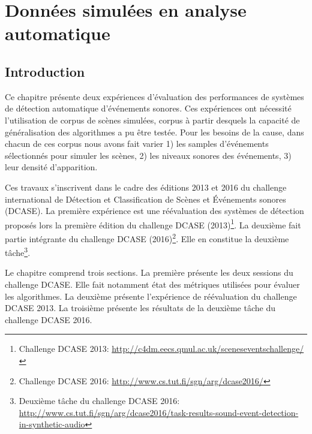 \chapter[Données simulées en analyse automatique]{Données simulées en analyse automatique}\label{ch:ml_simuperf}


\section{Introduction}

Ce chapitre présente deux expériences d'évaluation des performances de systèmes de détection automatique d'événements sonores. Ces expériences ont nécessité l'utilisation de corpus de scènes simulées, corpus à partir desquels la capacité de généralisation des algorithmes a pu être testée. Pour les besoins de la cause, dans chacun de ces corpus nous avons fait varier 1) les samples d'événements sélectionnés pour simuler les scènes, 2) les niveaux sonores des événements, 3) leur densité d'apparition.

Ces travaux s'inscrivent dans le cadre des éditions 2013 et 2016 du challenge international de Détection et Classification de Scènes et Événements sonores (DCASE). La première expérience est une réévaluation des systèmes de détection proposés lors la première édition du challenge DCASE (2013)\footnote{Challenge DCASE 2013: \url{http://c4dm.eecs.qmul.ac.uk/sceneseventschallenge/}}. La deuxième fait partie intégrante du challenge DCASE (2016)\footnote{Challenge DCASE 2016: \url{http://www.cs.tut.fi/sgn/arg/dcase2016/}}. Elle en constitue la deuxième tâche\footnote{Deuxième tâche du challenge DCASE 2016: \url{http://www.cs.tut.fi/sgn/arg/dcase2016/task-results-sound-event-detection-in-synthetic-audio}}.

Le chapitre comprend trois sections. La première présente les deux sessions du challenge DCASE. Elle fait notamment état des métriques utilisées pour évaluer les algorithmes. La deuxième présente l'expérience de réévaluation du challenge DCASE 2013. La troisième présente les résultats de la deuxième tâche du challenge DCASE 2016.

